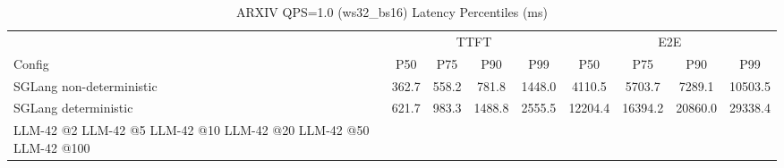 \begin{table}[htbp]
\centering
\caption{ARXIV QPS=1.0 (ws32_bs16) Latency Percentiles (ms)}
\label{tab:arxiv_qps1.0_ws32_bs16}
\begin{tabular}{l|cccc|cccc}
\toprule
& \multicolumn{4}{c|}{TTFT} & \multicolumn{4}{c}{E2E} \\
Config & P50 & P75 & P90 & P99 & P50 & P75 & P90 & P99 \\
\midrule
SGLang non-deterministic & 362.7 & 558.2 & 781.8 & 1448.0 & 4110.5 & 5703.7 & 7289.1 & 10503.5 \\
SGLang deterministic & 621.7 & 983.3 & 1488.8 & 2555.5 & 12204.4 & 16394.2 & 20860.0 & 29338.4 \\
LLM-42 @2%
LLM-42 @5%
LLM-42 @10%
LLM-42 @20%
LLM-42 @50%
LLM-42 @100%
\bottomrule
\end{tabular}
\end{table}
